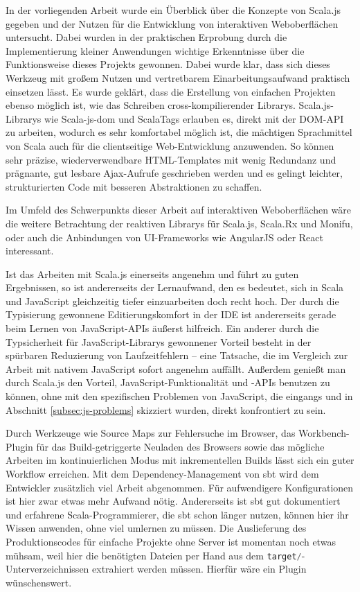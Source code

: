 \documentclass[a4paper, 12pt, hidelinks, listof=totoc, listoftables=totoc, bibliography=totoc]{scrreprt}
\newcommand{\code}[1]{\lstinline[language=Scala, style=inline]|#1|}
\begin{document}
In der vorliegenden Arbeit wurde ein Überblick über die Konzepte von Scala.js gegeben und der Nutzen für die Entwicklung von interaktiven Weboberflächen untersucht. Dabei wurden in der praktischen Erprobung durch die Implementierung kleiner Anwendungen wichtige Erkenntnisse über die Funktionsweise dieses Projekts gewonnen. Dabei wurde klar, dass sich dieses Werkzeug mit großem Nutzen und vertretbarem Einarbeitungsaufwand praktisch einsetzen lässt. Es wurde geklärt, dass die Erstellung von einfachen Projekten ebenso möglich ist, wie das Schreiben cross-kompilierender Librarys. Scala.js-Librarys wie Scala-js-dom und ScalaTags erlauben es, direkt mit der \ac{DOM}-API zu arbeiten, wodurch es sehr komfortabel möglich ist, die mächtigen Sprachmittel von Scala auch für die clientseitige Web-Entwicklung anzuwenden. So können sehr präzise, wiederverwendbare \ac{HTML}-Templates mit wenig Redundanz und prägnante, gut lesbare Ajax-Aufrufe geschrieben werden und es gelingt leichter, strukturierten Code mit besseren Abstraktionen zu schaffen.

Im Umfeld des Schwerpunkts dieser Arbeit auf interaktiven Weboberflächen wäre die weitere Betrachtung der reaktiven Librarys für Scala.js, Scala.Rx und Monifu, oder auch die Anbindungen von UI-Frameworks wie AngularJS oder React interessant.

Ist das Arbeiten mit Scala.js einerseits angenehm und führt zu guten Ergebnissen, so ist andererseits der Lernaufwand, den es bedeutet, sich in Scala und JavaScript gleichzeitig tiefer einzuarbeiten doch recht hoch. Der durch die Typisierung gewonnene Editierungskomfort in der \ac{IDE} ist andererseits gerade beim Lernen von JavaScript-\ac{API}s äußerst hilfreich. Ein anderer durch die Typsicherheit für JavaScript-Librarys gewonnener Vorteil besteht in der spürbaren Reduzierung von Laufzeitfehlern -- eine Tatsache, die im Vergleich zur Arbeit mit nativem JavaScript sofort angenehm auffällt. Außerdem genießt man durch Scala.js den Vorteil, JavaScript-Funktionalität und -\ac{API}s benutzen zu können, ohne mit den spezifischen Problemen von JavaScript, die eingangs und in Abschnitt \ref{subsec:js-problems} skizziert wurden, direkt konfrontiert zu sein.

Durch Werkzeuge wie Source Maps zur Fehlersuche im Browser, das Workbench-Plugin für das Build-getriggerte Neuladen des Browsers sowie das mögliche Arbeiten im kontinuierlichen Modus mit inkrementellen Builds lässt sich ein guter Workflow erreichen. Mit dem Dependency-Management von sbt wird dem Entwickler zusätzlich viel Arbeit abgenommen. Für aufwendigere Konfigurationen ist hier zwar etwas mehr Aufwand nötig. Andererseits ist sbt gut dokumentiert und erfahrene Scala-Programmierer, die sbt schon länger nutzen, können hier ihr Wissen anwenden, ohne viel umlernen zu müssen. Die Auslieferung des Produktionscodes für einfache Projekte ohne Server ist momentan noch etwas mühsam, weil hier die benötigten Dateien per Hand aus dem \code{target/}-Unterverzeichnissen extrahiert werden müssen. Hierfür wäre ein Plugin wünschenswert.
\end{document}
